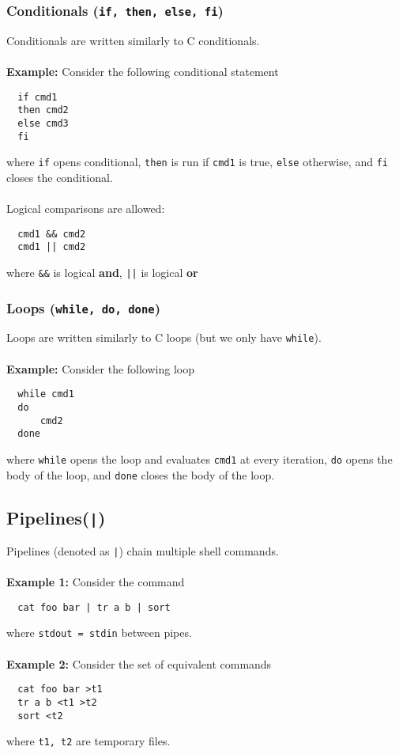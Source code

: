 \documentclass[13pt]{article}
\begin{document}
  \subsubsection{Conditionals (\texttt{if, then, else, fi})}
  Conditionals are written similarly to C conditionals. \\ \\
  \textbf{Example:} Consider the following conditional statement
\begin{verbatim}
  if cmd1
  then cmd2
  else cmd3
  fi \end{verbatim}
where \texttt{if} opens conditional, \texttt{then} is run if \texttt{cmd1} is true, \texttt{else} otherwise, and \texttt{fi} closes the conditional. \\ \\
Logical comparisons are allowed:
\begin{verbatim}
  cmd1 && cmd2
  cmd1 || cmd2 \end{verbatim}
where \texttt{\&\&} is logical \textbf{and}, \texttt{||} is logical \textbf{or}

\subsubsection{Loops (\texttt{while, do, done})}
Loops are written similarly to C loops (but we only have \texttt{while}). \\ \\
\textbf{Example:} Consider the following loop
\begin{verbatim}
  while cmd1
  do
      cmd2
  done \end{verbatim}
where \texttt{while} opens the loop and evaluates \texttt{cmd1} at every iteration, \texttt{do} opens the body of the loop, and \texttt{done} closes the body of the loop.

\subsection{Pipelines(\texttt{|})}
Pipelines (denoted as \texttt{|}) chain multiple shell commands. \\ \\
\textbf{Example 1:} Consider the command
\begin{verbatim}
  cat foo bar | tr a b | sort \end{verbatim}
where \texttt{stdout = stdin} between pipes. \\ \\
\textbf{Example 2:} Consider the set of equivalent commands
\begin{verbatim}
  cat foo bar >t1
  tr a b <t1 >t2
  sort <t2 \end{verbatim}
where \texttt{t1, t2} are temporary files.
\end{document}
